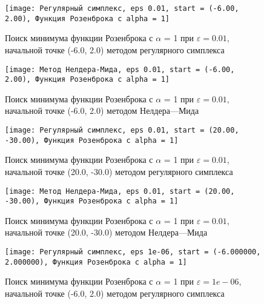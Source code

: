             \begin{figure}[H]
	        \centering
	        \texttt{[image: Регулярный симплекс, eps 0.01, start = (-6.00, 2.00), Функция Розенброка с alpha = 1]}%
	        \caption{Поиск минимума функции Розенброка с $\alpha$ = 1 при $\varepsilon = 0.01$, начальной точке (-6.0, 2.0) методом регулярного симплекса}
	        \vspace*{-1.2cm}
            \end{figure}
            
            \begin{figure}[H]
	        \centering
	        \texttt{[image: Метод Нелдера-Мида, eps 0.01, start = (-6.00, 2.00), Функция Розенброка с alpha = 1]}%
	        \caption{Поиск минимума функции Розенброка с $\alpha$ = 1 при $\varepsilon = 0.01$, начальной точке (-6.0, 2.0) методом Нелдера---Мида}
	        \vspace*{-1.2cm}
            \end{figure}
            
            \begin{figure}[H]
	        \centering
	        \texttt{[image: Регулярный симплекс, eps 0.01, start = (20.00, -30.00), Функция Розенброка с alpha = 1]}%
	        \caption{Поиск минимума функции Розенброка с $\alpha$ = 1 при $\varepsilon = 0.01$, начальной точке (20.0, -30.0) методом регулярного симплекса}
	        \vspace*{-1.2cm}
            \end{figure}
            
            \begin{figure}[H]
	        \centering
	        \texttt{[image: Метод Нелдера-Мида, eps 0.01, start = (20.00, -30.00), Функция Розенброка с alpha = 1]}%
	        \caption{Поиск минимума функции Розенброка с $\alpha$ = 1 при $\varepsilon = 0.01$, начальной точке (20.0, -30.0) методом Нелдера---Мида}
	        \vspace*{-1.2cm}
            \end{figure}
            
            \begin{figure}[H]
	        \centering
	        \texttt{[image: Регулярный симплекс, eps 1e-06, start = (-6.000000, 2.000000), Функция Розенброка с alpha = 1]}%
	        \caption{Поиск минимума функции Розенброка с $\alpha$ = 1 при $\varepsilon = 1e-06$, начальной точке (-6.0, 2.0) методом регулярного симплекса}
	        \vspace*{-1.2cm}
            \end{figure}
            
